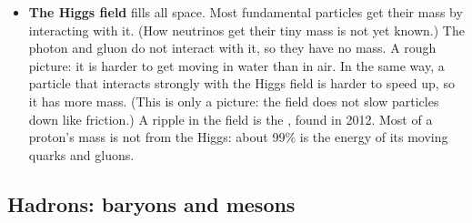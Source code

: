 \begin{itemize}
  \item \textbf{The Higgs field} fills all space. Most fundamental particles get their mass
        by interacting with it. (How neutrinos get their tiny mass is not yet known.) The
        photon and gluon do not interact with it, so they have no mass. A rough picture:
        it is harder to get moving in water than in air. In the same way, a particle that
        interacts strongly with the Higgs field is harder to speed up, so it has more
        mass. (This is only a picture: the field does not slow particles down like
        friction.) A ripple in the field is the , found in 2012. Most
        of a proton's mass is not from the Higgs: about 99\% is the energy of its moving
        quarks and gluons.
\end{itemize}

\subsection{Hadrons: baryons and mesons}

